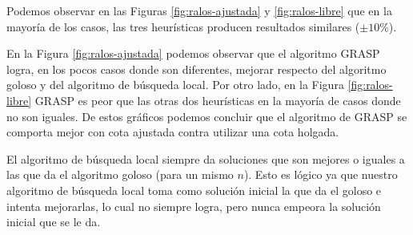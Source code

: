 Podemos observar en las Figuras \ref{fig:ralos-ajustada} y \ref{fig:ralos-libre} que en la mayoría de los casos, las tres heurísticas producen resultados similares ($ \pm 10\%$).

En la Figura \ref{fig:ralos-ajustada} podemos observar que el algoritmo GRASP logra, en los pocos casos donde son diferentes, mejorar respecto del algoritmo goloso y del algoritmo de búsqueda local. Por otro lado, en la Figura \ref{fig:ralos-libre} GRASP es peor que las otras dos heurísticas en la mayoría de casos donde no son iguales. De estos gráficos podemos concluir que el algoritmo de GRASP se comporta mejor con cota ajustada contra utilizar una cota holgada.

El algoritmo de búsqueda local siempre da soluciones que son mejores o iguales a las que da el algoritmo goloso (para un mismo $n$). Esto es lógico ya que nuestro algoritmo de búsqueda local toma como solución inicial la que da el goloso e intenta mejorarlas, lo cual no siempre logra, pero nunca empeora la solución inicial que se le da.


